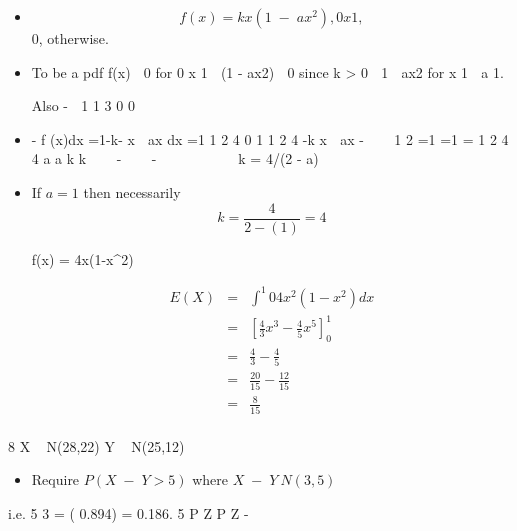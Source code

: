 \documentclass[a4paper,12pt]{article}
\begin{document}
\begin{itemize}
    \item 

\[f(x) = kx(1 \;-\; ax^2), 0 
 x 
 1,\]
0, otherwise.
\item To be a pdf f(x)  0 for 0 
 x 
 1  (1 \;-\; ax2)  0 since k > 0
 1  ax2 for x 
 1  a 
 1.

Also \;-\; 
1 1 3
0 0
\item \;-\; f (x)dx =1\;-\;k\;-\; x  ax dx =1
1
2 4
0
1 1
2 4
\;-\;k x  ax \;-\; 
 
1 2
=1 =1 = 1
2 4 4
a a
k k
   \;-\; 
  \;-\;    
   
 k = 4/(2 \;-\; a)

\item 
If $a=1$ then necessarily \[ k = \frac{4}{2-(1)} = 4\]

f(x) = 4x(1-x^2)

\begin{eqnarray*}
E(X) &=& \int^{1}{0} 4x^2(1-x^2) dx \\
&=& \left[ \frac{4}{3}x^3 - \frac{4}{5}x^5 \right]^{1}_{0}\\
&=&  \frac{4}{3} -  \frac{4}{5}\\
&=&  \frac{20}{15} -  \frac{12}{15}\\
&=& \frac{8}{15}\\
\end{eqnarray*}
\end{itemize}
8 X ~ N(28,22) Y ~ N(25,12)
\begin{itemize}
\item Require $P(X \;-\; Y > 5)$ where $X \;-\; Y ~ N(3,5)$
\end{itemize}
i.e.
5 3
= ( 0.894) = 0.186.
5
P Z P Z
\;-\;  
   
\end{document}
